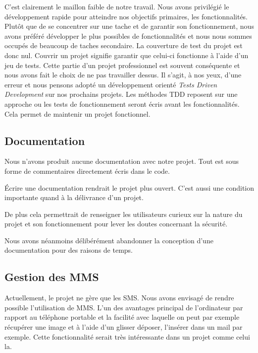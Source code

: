 C'est clairement le maillon faible de notre travail. Nous avons privilégié le développement rapide pour atteindre nos objectifs
primaires, les fonctionnalités. Plutôt que de se concentrer sur une tache et de garantir son fonctionnement, nous avons préféré
développer le plus possibles de fonctionnalités et nous nous sommes occupés de beaucoup de taches secondaire. La couverture 
de test du projet est donc nul. Couvrir un projet signifie garantir que celui-ci fonctionne à l'aide d'un jeu de tests. Cette partie
d'un projet professionnel est souvent conséquente et nous avons fait le choix de ne pas travailler dessus. Il s'agit, à nos yeux, 
d'une erreur et nous pensons adopté un développement orienté \textit{Tests Driven Development} sur nos prochains projets. Les méthodes
TDD reposent sur une approche ou les tests de fonctionnement seront écris avant les fonctionnalités. Cela permet de maintenir un projet
fonctionnel.




\subsection{Documentation}

Nous n'avons produit aucune documentation avec notre projet.
Tout est sous forme de commentaires directement écris dans le code.

Écrire une documentation rendrait le projet plus ouvert.
C'est aussi une condition importante quand à la délivrance d'un projet.

De plus cela permettrait de renseigner les utilisateurs curieux sur la nature du projet et son fonctionnement pour lever les doutes concernant la sécurité.

Nous avons néanmoins délibérément abandonner la conception d'une documentation pour des raisons de temps.




\subsection{Gestion des MMS}

Actuellement, le projet ne gère que les SMS. Nous avons envisagé de rendre possible l'utilisation de MMS. L'un des avantages principal
de l'ordinateur par rapport au téléphone portable et la facilité avec laquelle on peut par exemple récupérer une image et à l'aide d'un
glisser déposer, l'insérer dans un mail par exemple. Cette fonctionnalité serait très intéressante dans un projet comme celui la. 
